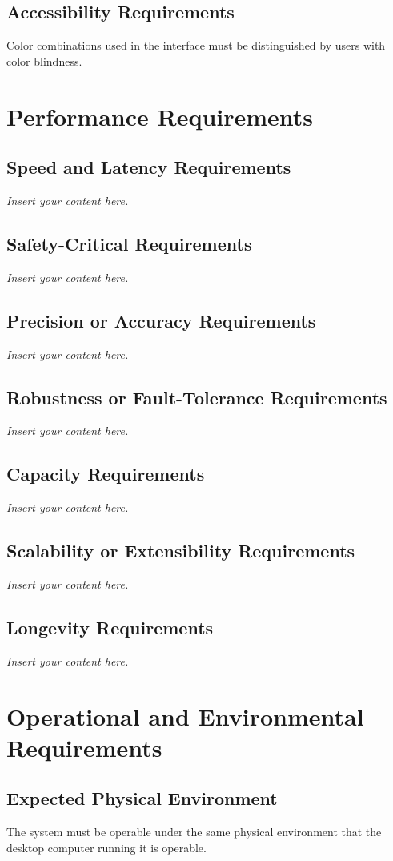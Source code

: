 \documentclass[12pt]{article}
\newcommand{\lips}{\textit{Insert your content here.}}
\begin{document}
\subsection{Accessibility Requirements}
Color combinations used in the interface must be distinguished by users with color blindness.

\section{Performance Requirements}
\subsection{Speed and Latency Requirements}
\lips
\subsection{Safety-Critical Requirements}
\lips
\subsection{Precision or Accuracy Requirements}
\lips
\subsection{Robustness or Fault-Tolerance Requirements}
\lips
\subsection{Capacity Requirements}
\lips
\subsection{Scalability or Extensibility Requirements}
\lips
\subsection{Longevity Requirements}
\lips

\section{Operational and Environmental Requirements}
\subsection{Expected Physical Environment}
The system must be operable under the same physical environment that the desktop computer running it is operable.
\end{document}
